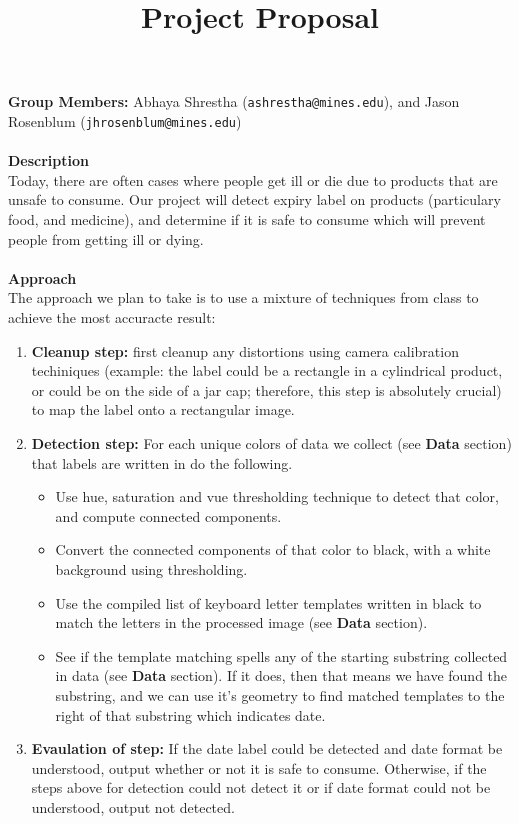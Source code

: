 \documentclass[12pt]{article}
\title{Project Proposal}
\begin{document}
 \maketitle
\textbf{Group Members:} Abhaya Shrestha (\texttt{ashrestha@mines.edu}), and
Jason Rosenblum (\texttt{jhrosenblum@mines.edu}) \\ \\
\textbf{Description} \\
Today, there are often cases where people get ill or die
due to products that are unsafe to consume. Our project will 
detect expiry label on products (particulary
food, and medicine), and determine if it is safe to consume which
will prevent people from getting ill or dying. \\ \\
\textbf{Approach} \\
The approach we plan to take is to use a mixture of techniques from class
to achieve the most accuracte result:
\begin{enumerate}
  \item \textbf{Cleanup step:} first cleanup any distortions
  using camera calibration techiniques (example: the label
  could be a rectangle in a cylindrical product, or could be
  on the side of a jar cap; therefore, this step is absolutely
  crucial) to map the label onto a rectangular image.
  \item \textbf{Detection step:} For each unique colors
  of data we collect (see \textbf{Data} section) that labels are written in do the following.
  \begin{itemize}
      \item Use hue, saturation and vue thresholding technique to detect that color,
      and compute connected components.
      \item Convert the connected components of that color to black, with a white
      background using thresholding.
      \item Use the compiled list of keyboard letter templates written
      in black to match the letters in the processed image (see \textbf{Data} section).
      \item See if the template matching spells any of the starting substring
      collected in data (see \textbf{Data} section). If it does, then that means we have found the
      substring, and we can use it's geometry to find matched templates to the
      right of that substring which indicates date.
  \end{itemize}
  \item \textbf{Evaulation of step:} If the date label could
  be detected and date format be understood, output
  whether or not it is safe to consume. Otherwise, if the steps above for detection could not
  detect it or if date format could not be understood, output not detected.
\end{enumerate}
\end{document}
